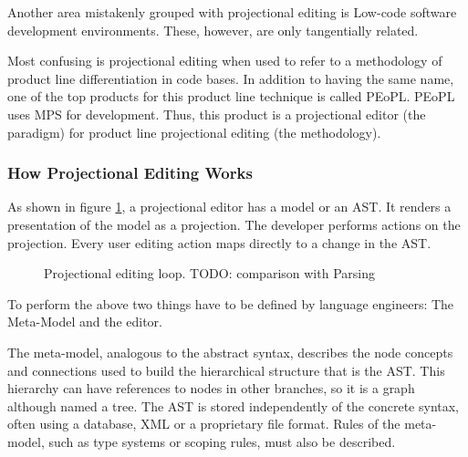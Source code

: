 Another area mistakenly grouped with projectional editing is Low-code software development environments.
These, however, are only tangentially related.

Most confusing is projectional editing when used to refer to a methodology of product line differentiation in code bases.
In addition to having the same name, one of the top products for this product line technique is called PEoPL.
PEoPL uses MPS for development.
Thus, this product is a projectional editor (the paradigm) for product line projectional editing (the methodology).

\subsubsection{How Projectional Editing Works}

As shown in figure \ref{fig:projectionalEditing_loop}, a projectional editor has a model or an AST.
It renders a presentation of the model as a projection.
The developer performs actions on the projection.
Every user editing action maps directly to a change in the AST.

\begin{figure}[h]
    \centering
    \caption{Projectional editing loop. TODO: comparison with Parsing}
    \label{fig:projectionalEditing_loop}
\end{figure}

To perform the above two things have to be defined by language engineers: The Meta-Model and the editor.

The meta-model, analogous to the abstract syntax, describes the node concepts and connections used to build the hierarchical structure that is the AST.
This hierarchy can have references to nodes in other branches, so it is a graph although named a tree.
The AST is stored independently of the concrete syntax, often using a database, XML or a proprietary file format.
Rules of the meta-model, such as type systems or scoping rules, must also be described.

